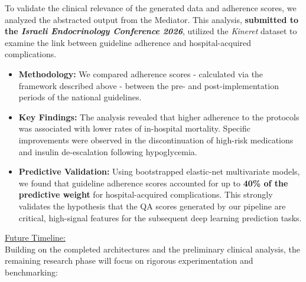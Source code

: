 \documentclass[
]{article}
\begin{document}
To validate the clinical relevance of the generated data and adherence
scores, we analyzed the abstracted output from the Mediator. This
analysis, \textbf{submitted to the \emph{Israeli Endocrinology
Conference 2026}}, utilized the \emph{Kineret} dataset to examine the
link between guideline adherence and hospital-acquired complications.

\begin{itemize}
\item
  \textbf{Methodology:} We compared adherence scores - calculated via
  the framework described above - between the pre- and
  post-implementation periods of the national guidelines.
\item
  \textbf{Key Findings:} The analysis revealed that higher adherence to
  the protocols was associated with lower rates of in-hospital
  mortality. Specific improvements were observed in the discontinuation
  of high-risk medications and insulin de-escalation following
  hypoglycemia.
\item
  \textbf{Predictive Validation:} Using bootstrapped elastic-net
  multivariate models, we found that guideline adherence scores
  accounted for up to \textbf{40\% of the predictive weight} for
  hospital-acquired complications. This strongly validates the
  hypothesis that the QA scores generated by our pipeline are critical,
  high-signal features for the subsequent deep learning prediction
  tasks.
\end{itemize}

\ul{Future Timeline:\\
}Building on the completed architectures and the preliminary clinical
analysis, the remaining research phase will focus on rigorous
experimentation and benchmarking:
\end{document}
